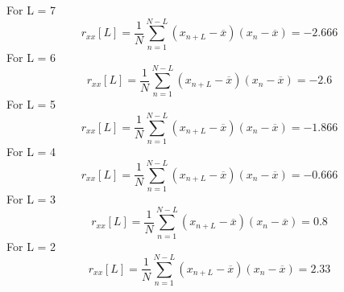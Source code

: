 \documentclass{article}
\begin{document}
  For L = 7
  \begin{equation}
      r_{xx}[L] = \frac{1}{N}\sum_{n=1}^{N - L} (x_{n+L} - \overline{x})(x_{n} - \overline{x}) = -2.666
 \end{equation}
  For L = 6
  \begin{equation}
      r_{xx}[L] = \frac{1}{N}\sum_{n=1}^{N - L} (x_{n+L} - \overline{x})(x_{n} - \overline{x}) = -2.6
 \end{equation}
   For L = 5
  \begin{equation}
      r_{xx}[L] = \frac{1}{N}\sum_{n=1}^{N - L} (x_{n+L} - \overline{x})(x_{n} - \overline{x}) = -1.866
 \end{equation}
   For L = 4
  \begin{equation}
      r_{xx}[L] = \frac{1}{N}\sum_{n=1}^{N - L} (x_{n+L} - \overline{x})(x_{n} - \overline{x}) = -0.666
 \end{equation}
   For L = 3
  \begin{equation}
      r_{xx}[L] = \frac{1}{N}\sum_{n=1}^{N - L} (x_{n+L} - \overline{x})(x_{n} - \overline{x}) = 0.8
 \end{equation}
   For L = 2
  \begin{equation}
      r_{xx}[L] = \frac{1}{N}\sum_{n=1}^{N - L} (x_{n+L} - \overline{x})(x_{n} - \overline{x}) = 2.33
 \end{equation}
\end{document}

